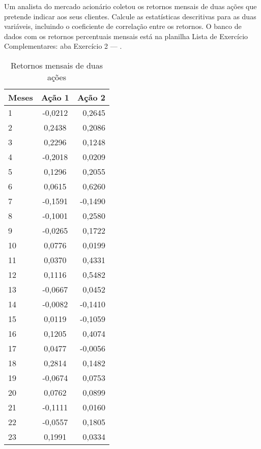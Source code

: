 \begin{exercise}
Um analista do mercado acionário coletou os retornos mensais de duas
ações que pretende indicar aos seus clientes. Calcule as estatísticas
descritivas para as duas variáveis, incluindo o coeficiente de correlação entre
os retornos. O banco de dados com os retornos percentuais mensais está na
planilha Lista de Exercício Complementares: aba Exercício 2
--- .
\begin{table}[htpb]
    \centering
    \begin{tabular}{lcr}
        \toprule
        Meses       & Ação 1  & Ação 2 \\
        \midrule
        1           & -0,0212 & 0,2645 \\
        2           & 0,2438  & 0,2086 \\
        3           & 0,2296  & 0,1248 \\
        4           & -0,2018 & 0,0209 \\
        5           & 0,1296  & 0,2055 \\
        6           & 0,0615  & 0,6260 \\
        7           & -0,1591 & -0,1490 \\
        8           & -0,1001 & 0,2580 \\
        9           & -0,0265 & 0,1722 \\
        10          & 0,0776  & 0,0199 \\
        11          & 0,0370  & 0,4331 \\
        12          & 0,1116  & 0,5482 \\
        13          & -0,0667 & 0,0452 \\
        14          & -0,0082 & -0,1410 \\
        15          & 0,0119  & -0,1059 \\
        16          & 0,1205  & 0,4074 \\
        17          & 0,0477  & -0,0056 \\
        18          & 0,2814  & 0,1482 \\
        19          & -0,0674 & 0,0753 \\
        20          & 0,0762  & 0,0899 \\
        21          & -0,1111 & 0,0160 \\
        22          & -0,0557 & 0,1805 \\
        23          & 0,1991  & 0,0334 \\
        \bottomrule
    \end{tabular}
    \caption{Retornos mensais de duas ações}
    \label{tab:ex_02_origem}
\end{table}
\end{exercise}

